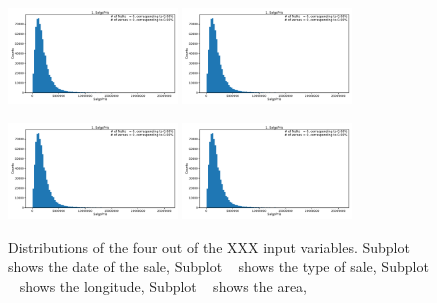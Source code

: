 \documentclass[a4paper, twoside]{tufte-book}
\begin{document}
\begin{figure}[htb]
  \centering
  
  \vspace*{-\abovecaptionskip}
  
  \subfloat[\label{fig:h:variable_overview_a}]{\qquad}
  \includegraphics[width=0.4\textwidth, page=2]{figures/housing/overview_fig.pdf}\hfil
  \subfloat[\label{fig:h:variable_overview_b}]{\qquad}
  \includegraphics[width=0.4\textwidth, page=6]{figures/housing/overview_fig.pdf}

  \subfloat[\label{fig:h:variable_overview_c}]{\qquad}
  \includegraphics[width=0.4\textwidth, page=20]{figures/housing/overview_fig.pdf}\hfil
  \subfloat[\label{fig:h:variable_overview_d}]{\qquad}
  \includegraphics[width=0.4\textwidth, page=23]{figures/housing/overview_fig.pdf}
  
  \caption[Input paramater distributions for the housing prices dataset]{Distributions of the four out of the XXX input variables. Subplot ~\protect{} shows the date of the sale, 
           Subplot ~\protect{} shows the type of sale,
           Subplot ~\protect{} shows the longitude,
           Subplot ~\protect{} shows the area,}
  \label{fig:h:variable_overview}
  
  \vspace{\abovecaptionskip}
\end{figure}
\end{document}
